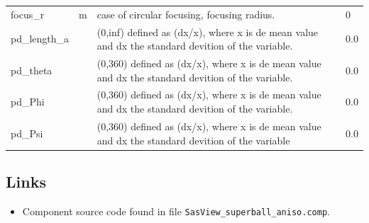 \begin{longtable}{p{}p{}p{}p{}}
focus\_r & m & case of circular focusing, focusing radius. & 0 \\
pd\_length\_a &  & (0,inf) defined as (dx/x), where x is de mean value and dx the standard devition of the variable. & 0.0 \\
pd\_theta &  & (0,360) defined as (dx/x), where x is de mean value and dx the standard devition of the variable. & 0.0 \\
pd\_Phi &  & (0,360) defined as (dx/x), where x is de mean value and dx the standard devition of the variable. & 0.0 \\
pd\_Psi &  & (0,360) defined as (dx/x), where x is de mean value and dx the standard devition of the variable & 0.0 \\
\bottomrule
\end{longtable}

\subsection*{Links}
\begin{itemize}
  \item Component source code found in file \texttt{SasView\_superball\_aniso.comp}.
\end{itemize}
